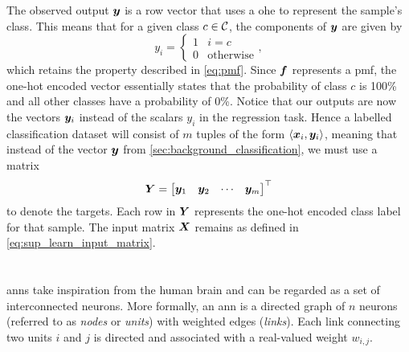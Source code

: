 \documentclass[../report.tex]{subfiles}
\begin{document}
The observed output ${\bm{y}}$ is a row vector that uses a \gls{ohe} to represent the sample's class. 
This means that for a given class $c \in {\mathcal{C}}$, the components of ${\bm{y}}$ are given by
\begin{equation*}
    y_i = \begin{cases}
        1 & i=c \\
        0 & \text{otherwise}
    \end{cases},
\end{equation*}
which retains the property described in \cref{eq:pmf}.
Since ${\bm{f}}$ represents a \gls{pmf}, the one-hot encoded vector essentially states that the probability of class $c$ is 100\% and all other classes have a probability of 0\%.
Notice that our outputs are now the vectors ${\bm{y}}_i$ instead of the scalars $y_i$ in the regression task.
Hence a labelled classification dataset will consist of $m$ tuples of the form $\langle {\bm{x}}_i,{\bm{y}}_i \rangle$, meaning that instead of the vector ${\bm{y}}$ from \cref{sec:background_classification}, we must use a matrix
\begin{equation}
    {\bm{Y}} = \begin{bmatrix}
        {\bm{y}}_1 & {\bm{y}}_2 & \cdots & {\bm{y}}_m
    \end{bmatrix}^\top
\end{equation}
to denote the targets.
Each row in ${\bm{Y}}$ represents the one-hot encoded class label for that sample. 
The input matrix ${\bm{X}}$ remains as defined in \cref{eq:sup_learn_input_matrix}.

\section{}
\label{sec:ann}
\Glspl{ann} take inspiration from the human brain and can be regarded as a set of interconnected neurons. 
More formally, an \gls{ann} is a directed graph of $n$ neurons (referred to as \emph{nodes} or \emph{units}) with weighted edges (\emph{links}).
Each link connecting two units $i$ and $j$ is directed and associated with a real-valued weight $w_{i,j}$. 
\end{document}
